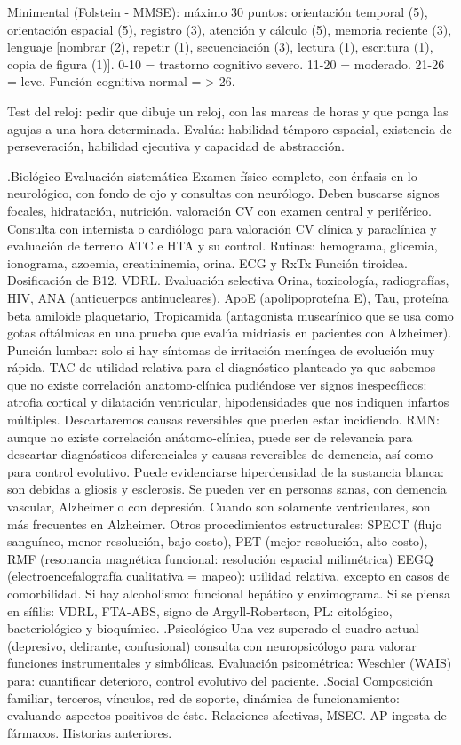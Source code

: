 \documentclass{scrbook}
\begin{document}
Minimental (Folstein - MMSE): máximo 30 puntos: orientación temporal (5), orientación espacial (5), registro (3), atención y cálculo (5), memoria reciente (3), lenguaje [nombrar (2), repetir (1), secuenciación (3), lectura (1), escritura (1), copia de figura (1)]. 0-10 = trastorno cognitivo severo. 11-20 = moderado. 21-26 = leve. Función cognitiva normal = > 26.

Test del reloj: pedir que dibuje un reloj, con las marcas de horas y que ponga las agujas a una hora determinada. Evalúa: habilidad témporo-espacial, existencia de perseveración, habilidad ejecutiva y capacidad de abstracción.

.Biológico
Evaluación sistemática Examen físico completo, con énfasis en lo neurológico, con fondo de ojo y consultas con neurólogo. Deben buscarse signos focales, hidratación, nutrición. valoración CV con examen central y periférico. Consulta con internista o cardiólogo para valoración CV clínica y paraclínica y evaluación de terreno ATC e HTA y su control. Rutinas: hemograma, glicemia, ionograma, azoemia, creatininemia, orina. ECG y RxTx Función tiroidea. Dosificación de B12. VDRL. Evaluación selectiva Orina, toxicología, radiografías, HIV, ANA (anticuerpos antinucleares), ApoE (apolipoproteína E), Tau, proteína beta amiloide plaquetario, Tropicamida (antagonista muscarínico que se usa como gotas oftálmicas en una prueba que evalúa midriasis en pacientes con Alzheimer). Punción lumbar: solo si hay síntomas de irritación meníngea de evolución muy rápida. TAC de utilidad relativa para el diagnóstico planteado ya que sabemos que no existe correlación anatomo-clínica pudiéndose ver signos inespecíficos: atrofia cortical y dilatación ventricular, hipodensidades que nos indiquen infartos múltiples. Descartaremos causas reversibles que pueden estar incidiendo. RMN: aunque no existe correlación anátomo-clínica, puede ser de relevancia para descartar diagnósticos diferenciales y causas reversibles de demencia, así como para control evolutivo. Puede evidenciarse hiperdensidad de la sustancia blanca: son debidas a gliosis y esclerosis. Se pueden ver en personas sanas, con demencia vascular, Alzheimer o con depresión. Cuando son solamente ventriculares, son más frecuentes en Alzheimer. Otros procedimientos estructurales: SPECT (flujo sanguíneo, menor resolución, bajo costo), PET (mejor resolución, alto costo), RMF (resonancia magnética funcional: resolución espacial milimétrica) EEGQ (electroencefalografía cualitativa = mapeo): utilidad relativa, excepto en casos de comorbilidad. Si hay alcoholismo: funcional hepático y enzimograma. Si se piensa en sífilis: VDRL, FTA-ABS, signo de Argyll-Robertson, PL: citológico, bacteriológico y bioquímico.
.Psicológico
Una vez superado el cuadro actual (depresivo, delirante, confusional) consulta con neuropsicólogo para valorar funciones instrumentales y simbólicas. Evaluación psicométrica: Weschler (WAIS) para: cuantificar deterioro, control evolutivo del paciente.
.Social
Composición familiar, terceros, vínculos, red de soporte, dinámica de funcionamiento: evaluando aspectos positivos de éste. Relaciones afectivas, MSEC. AP ingesta de fármacos. Historias anteriores.
\end{document}
